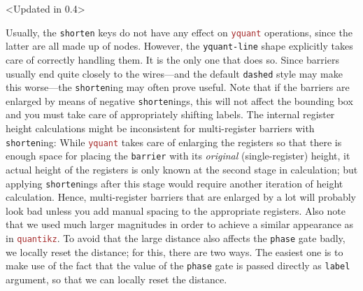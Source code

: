 \documentclass{scrartcl}
\makeatletter
\newenvironment{codeexample*}{%
   \VerbatimEnvironment%
   \let\FVB@VerbatimOut\minted@FVB@VerbatimOut
   \let\FVE@VerbatimOut\minted@FVE@VerbatimOut
   \minted@configlang{tex}%
   \minted@fvset
   \begin{VerbatimOut}[codes={\catcode`\^^I=12},firstline,lastline]{\minted@jobname.pyg}%
}{
   \end{VerbatimOut}%
   \minted@langlinenoson%
   \begin{adjustbox}{center}
       \minted@jobname.pyg %
   \end{adjustbox}\nopagebreak
   \expandafter\minted@pygmentize\expandafter{\minted@lang}%
   \minted@langlinenosoff%
   \par%
}
\def\pkg#1{\textcolor{brown}{\texttt{#1}}}
\def\ttlink{\link\texttt}
\def\Yquant{\pkg{yquant}}
\makeatother
\begin{document}
            \begin{example}<Updated in 0.4>
               \begin{codeexample*}
               \end{codeexample*}
               Usually, the \texttt{shorten} keys do not have any effect on \Yquant{} operations, since the latter are all made up of nodes.
               However, the \texttt{yquant-line} shape explicitly takes care of correctly handling them.
               It is the only one that does so.
               Since barriers usually end quite closely to the wires---and the default \texttt{dashed} style may make this worse---the \texttt{shorten}ing may often prove useful.
               Note that if the barriers are enlarged by means of negative \texttt{shorten}ings, this will not affect the bounding box and you must take care of appropriately shifting labels.
               The internal register height calculations might be inconsistent for multi\hyp register barriers with \texttt{shorten}ing: While \Yquant{} takes care of enlarging the registers so that there is enough space for placing the \ttlink{barrier} with its \emph{original} (single\hyp register) height, it actual height of the registers is only known at the second stage in calculation; but applying \texttt{shorten}ings after this stage would require another iteration of height calculation.
               Hence, multi\hyp register barriers that are enlarged by a lot will probably look bad unless you add manual spacing to the appropriate registers.
               Also note that we used much larger magnitudes in order to achieve a similar appearance as in \pkg{quantikz}.
               To avoid that the large distance also affects the \ttlink{phase} gate badly, we locally reset the distance; for this, there are two ways.
               The easiest one is to make use of the fact that the value of the \ttlink{phase} gate is passed directly as \texttt{label} argument, so that we can locally reset the distance.

\end{example}
\end{document}
